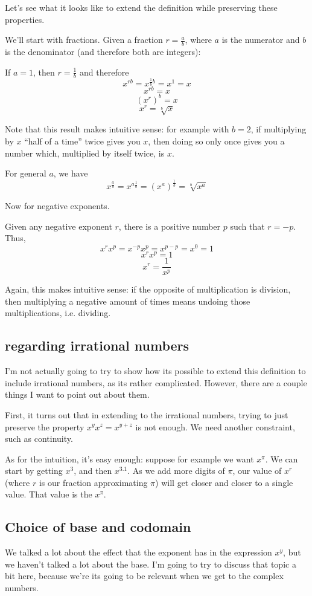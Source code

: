 \documentclass[11pt, oneside]{article}   	%
\begin{document}
Let's see what it looks like to extend the definition while preserving these properties. 

We'll start with fractions. Given a fraction $r=\frac{a}{b}$, where $a$ is the numerator and $b$ is the denominator (and therefore both are integers):

If $a=1$, then $r=\frac{1}{b}$ and therefore \[x^{rb} = x^{\frac{1}{b}b}=x^1=x\]
\[x^{rb}=x\]
\[(x^r)^b=x\]
\[x^r=\sqrt[b]{x}\]

Note that this result makes intuitive sense: for example with $b=2$, if multiplying by $x$ ``half of a time'' twice gives you $x$, then doing so only once gives you a number which, multiplied by itself twice, is $x$.


For general $a$, we have 
\[x^{\frac{a}{b}}=x^{a\frac{1}{b}}=(x^a)^\frac{1}{b}=\sqrt[b]{x^a}\]

Now for negative exponents.

Given any negative exponent $r$, there is a positive number $p$ such that $r=-p$. Thus,
\[x^rx^p=x^{-p}x^p=x^{p-p}=x^0=1\]
\[x^rx^p=1\]
\[x^r=\frac{1}{x^p}\]

Again, this makes intuitive sense: if the opposite of multiplication is division, then multiplying a negative amount of times means undoing those multiplications, i.e. dividing.

\subsection{regarding irrational numbers}

I'm not actually going to try to show how its possible to extend this definition to include irrational numbers, as its rather complicated. However, there are a couple things I want to point out about them. 

First, it turns out that in extending to the irrational numbers, trying to just preserve the property $x^yx^z=x^{y+z}$ is not enough. We need another constraint, such as continuity.

As for the intuition, it's easy enough: suppose for example we want $x^\pi$. We can start by getting $x^3$, and then $x^{3.1}$. As we add more digits of $\pi$, our value of $x^r$ (where $r$ is our fraction approximating $\pi$) will get closer and closer to a single value. That value is the $x^\pi$.

\subsection{Choice of base and codomain}
We talked a lot about the effect that the exponent has in the expression $x^y$, but we haven't talked a lot about the base. I'm going to try to discuss that topic a bit here, because we're its going to be relevant when we get to the complex numbers.
\end{document}
